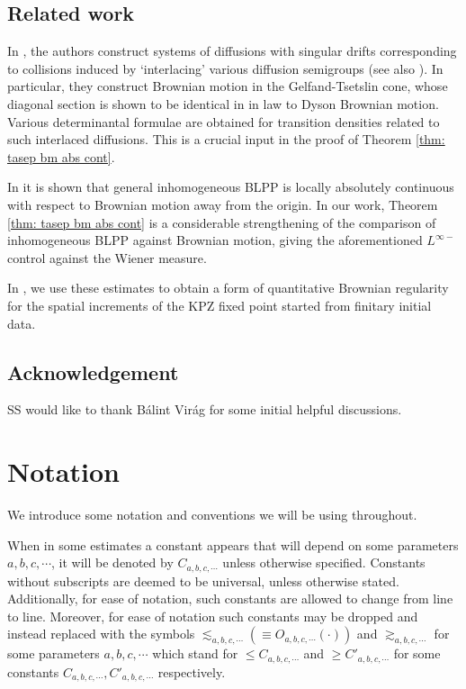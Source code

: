 \documentclass[11pt, reqno]{amsart}
\numberwithin{equation}{section}
\begin{document}
\subsection{Related work}
In \cite{warren2007dyson, assiotis2019interlacing}, the authors construct systems of diffusions with singular drifts corresponding to collisions induced by `interlacing' various diffusion semigroups (see also \cite{rogers1981markov}). In particular, they construct Brownian motion in the Gelfand-Tsetslin cone, whose diagonal section is shown to be identical in \cite[Proposition 6]{warren2007dyson} in law to Dyson Brownian motion. Various determinantal formulae are obtained for transition densities related to such interlaced diffusions. This is a crucial input in the proof of Theorem \ref{thm: tasep bm abs cont}.

In \cite[Theorem 4.3]{Sarkar2021Brownian} it is shown that general inhomogeneous BLPP is locally absolutely continuous with respect to Brownian motion away from the origin. In our work, Theorem \ref{thm: tasep bm abs cont} is a considerable strengthening of the comparison of inhomogeneous BLPP against Brownian motion, giving the aforementioned $L^{\infty-}$ control against the Wiener measure.

In \cite[Theorem 6.6]{tassopoulos2025quantitativebrownianregularitykpz}, we use these estimates to obtain a form of quantitative Brownian regularity for the spatial increments of the KPZ fixed point started from finitary initial data. 

\subsection{Acknowledgement} SS would like to thank B\'alint Vir\'ag for some initial helpful discussions. 

\section{Notation}\label{sec: notation}

We introduce some notation and conventions we will be using throughout.

When in some estimates a constant appears that will depend on some parameters $a,b,c,\cdots$, it will be denoted by $C_{a,b,c,\cdots}$ unless otherwise specified. Constants without subscripts are deemed to be universal, unless otherwise stated. Additionally, for ease of notation, such constants are allowed to change from line to line. Moreover, for ease of notation such constants may be dropped and instead replaced with the symbols $\lesssim_{a,b,c,\cdots}(\equiv O_{a,b,c,\cdots}(\cdot))$ and $\gtrsim_{a,b,c,\cdots}$ for some parameters $a,b,c,\cdots$ which stand for $\le C_{a,b,c,\cdots}$ and $\ge C'_{a,b,c,\cdots}$ for some constants $C_{a,b,c,\cdots}, C'_{a,b,c,\cdots}$ respectively.
\end{document}
